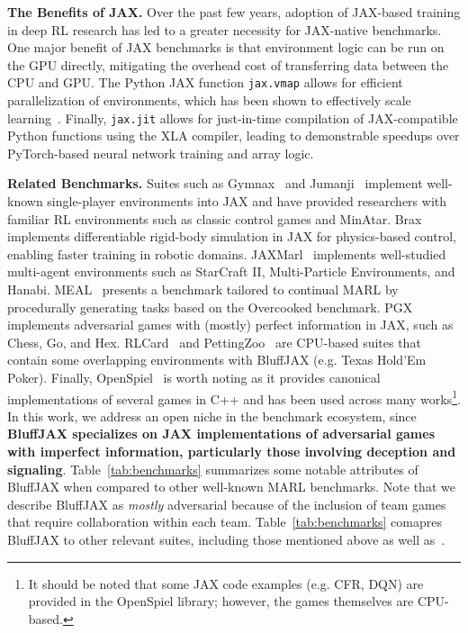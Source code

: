 \textbf{The Benefits of JAX.} Over the past few years, adoption of JAX-based training in deep RL research has led to a greater necessity for JAX-native benchmarks. One major benefit of JAX benchmarks is that environment logic can be run on the GPU directly, mitigating the overhead cost of transferring data between the CPU and GPU. The Python JAX function \texttt{jax.vmap} allows for efficient parallelization of environments, which has been shown to effectively scale learning~\citep{gallici2024simplifying}. Finally, \texttt{jax.jit} allows for just-in-time compilation of JAX-compatible Python functions using the XLA compiler, leading to demonstrable speedups over PyTorch-based neural network training and array logic.

\textbf{Related Benchmarks.} Suites such as Gymnax~\citep{gymnax} and Jumanji~\citep{bonnet_jumanji_2024} implement well-known single-player environments into JAX and have provided researchers with familiar RL environments such as classic control games and MinAtar. Brax~\citep{freeman2021brax} implements differentiable rigid-body simulation in JAX for physics-based control, enabling faster training in robotic domains. JAXMarl~\citep{rutherford_jaxmarl_2024} implements well-studied multi-agent environments such as StarCraft II, Multi-Particle Environments, and Hanabi. MEAL~\citep{tomilin_meal_2025} presents a benchmark tailored to continual MARL by procedurally generating tasks based on the Overcooked benchmark. PGX~\citep{koyamada_pgx_2023} implements adversarial games with (mostly) perfect information in JAX, such as Chess, Go, and Hex. RLCard~\citep{zha_rlcard_2020} and PettingZoo~\citep{terry2021pettingzoo} are CPU-based suites that contain some overlapping environments with BluffJAX (e.g. Texas Hold'Em Poker). Finally, OpenSpiel~\citep{lanctot2019openspiel} is worth noting as it provides canonical implementations of several games in C++ and has been used across many works\footnote{It should be noted that some JAX code examples (e.g. CFR, DQN) are provided in the OpenSpiel library; however, the games themselves are CPU-based.}. In this work, we address an open niche in the benchmark ecosystem, since \textbf{BluffJAX specializes on JAX implementations of adversarial games with imperfect information, particularly those involving deception and signaling}. Table~\ref{tab:benchmarks} summarizes some notable attributes of BluffJAX when compared to other well-known MARL benchmarks. Note that we describe BluffJAX as \textit{mostly} adversarial because of the inclusion of team games that require collaboration within each team. Table~\ref{tab:benchmarks} comapres BluffJAX to other relevant suites, including those mentioned above as well as~\citet{ruhdorfer2024overcooked, agapiou2022melting,kurach2020google}.

